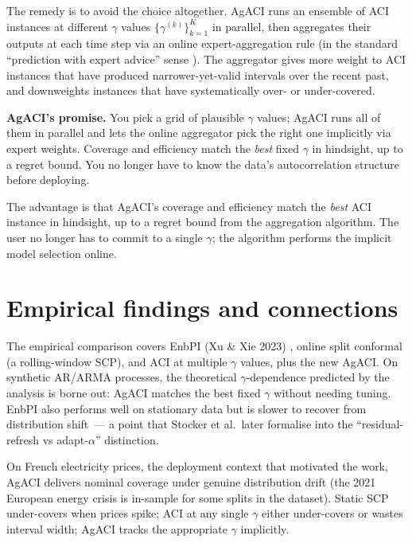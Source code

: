 \documentclass[letterpaper,11pt,leqno]{article}
\begin{document}
The remedy is to avoid the choice altogether. AgACI runs an ensemble of ACI instances at different $\gamma$ values $\{\gamma^{(k)}\}_{k=1}^K$ in parallel, then aggregates their outputs at each time step via an online expert-aggregation rule (in the standard ``prediction with expert advice'' sense \cite{cesabianchi2006prediction}). The aggregator gives more weight to ACI instances that have produced narrower-yet-valid intervals over the recent past, and downweights instances that have systematically over- or under-covered.

\begin{keyinsight}
\textbf{AgACI's promise.} You pick a grid of plausible $\gamma$ values; AgACI runs all of them in parallel and lets the online aggregator pick the right one implicitly via expert weights. Coverage and efficiency match the \emph{best} fixed $\gamma$ in hindsight, up to a regret bound. You no longer have to know the data's autocorrelation structure before deploying.
\end{keyinsight}

The advantage is that AgACI's coverage and efficiency match the \emph{best} ACI instance in hindsight, up to a regret bound from the aggregation algorithm. The user no longer has to commit to a single $\gamma$; the algorithm performs the implicit model selection online.

\section{Empirical findings and connections}\label{s:discussion}

The empirical comparison covers EnbPI (Xu \& Xie 2023) \cite{xu2023enbpi}, online split conformal (a rolling-window SCP), and ACI at multiple $\gamma$ values, plus the new AgACI. On synthetic AR/ARMA processes, the theoretical $\gamma$-dependence predicted by the analysis is borne out: AgACI matches the best fixed $\gamma$ without needing tuning. EnbPI also performs well on stationary data but is slower to recover from distribution shift~--- a point that Stocker et al.\ later formalise into the ``residual-refresh vs adapt-$\alpha$'' distinction.

On French electricity prices, the deployment context that motivated the work, AgACI delivers nominal coverage under genuine distribution drift (the 2021 European energy crisis is in-sample for some splits in the dataset). Static SCP under-covers when prices spike; ACI at any single $\gamma$ either under-covers or wastes interval width; AgACI tracks the appropriate $\gamma$ implicitly.
\end{document}
